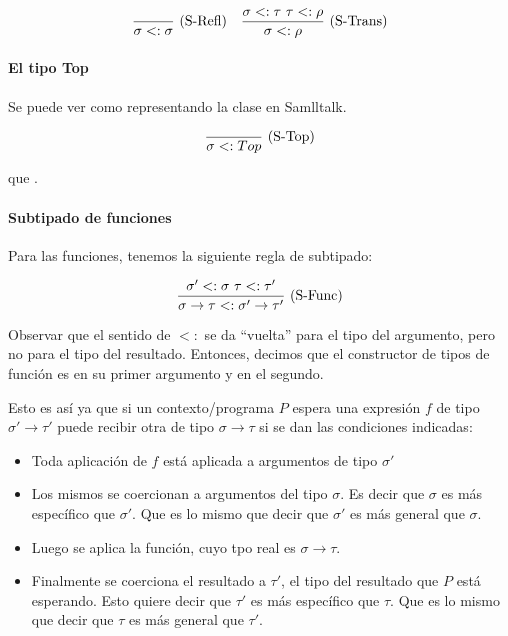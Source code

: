 \[\deriv{}{\subt{\sigma}{\sigma}}{S-Refl} \quad \deriv{\subt{\sigma}{\tau}\ \subt{\tau}{\rho}}{\subt{\sigma}{\rho}}{S-Trans}\]

\paragraph{El tipo Top}

Se puede ver como representando la clase  en Samlltalk.

\[\frac{}{\sigma <: Top}\ \text{(S-Top)}\]

 que .

\paragraph{Subtipado de funciones}

Para las funciones, tenemos la siguiente regla de subtipado:

\[\deriv{\subt{\sigma'}{\sigma}\ \subt{\tau}{\tau'}}{\subt{\sigma\to\tau}{\sigma'\to\tau'}}{S-Func}\]

Observar que el sentido de $<:$ se da ``vuelta'' para el tipo del argumento, pero no para el tipo del resultado.
Entonces, decimos que el constructor de tipos de función es  en su primer argumento y  en el segundo.

Esto es así ya que si un contexto/programa $P$ espera una expresión $f$ de tipo $\sigma'\to\tau'$ puede recibir otra de tipo $\sigma\to\tau$ si se dan las condiciones indicadas:

\begin{itemize}
  \item Toda aplicación de $f$ está aplicada a argumentos de tipo $\sigma'$
  \item Los mismos se coercionan a argumentos del tipo $\sigma$. Es decir que $\sigma$ es más específico que $\sigma'$. Que es lo mismo que decir que $\sigma'$ es más general que $\sigma$.
  \item Luego se aplica la función, cuyo tpo real es $\sigma\to\tau$.
  \item Finalmente se coerciona el resultado a $\tau'$, el tipo del resultado que $P$ está esperando. Esto quiere decir que $\tau'$ es más específico que $\tau$. Que es lo mismo que decir que $\tau$ es más general que $\tau'$.
\end{itemize}


